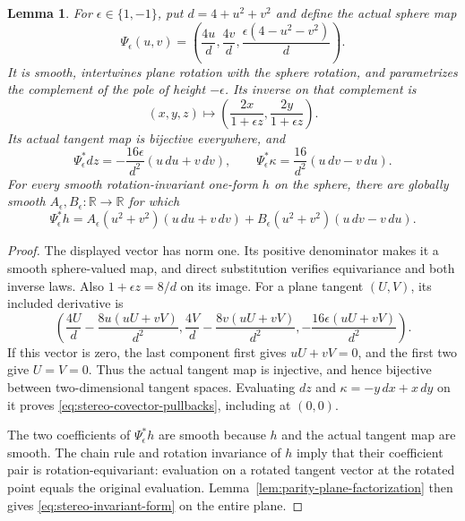 \documentclass[11pt]{article}
\newtheorem{lemma}[theorem]{Lemma}
\newcommand{\R}{\mathbb R}
\begin{document}
\begin{lemma}\label{lem:stereographic-invariant-form}
For $\epsilon\in\{1,-1\}$, put $d=4+u^2+v^2$ and define the actual sphere map
\[
 \Psi_\epsilon(u,v)=
 \left(\frac{4u}{d},\frac{4v}{d},
             \frac{\epsilon(4-u^2-v^2)}{d}\right).
\]
It is smooth, intertwines plane rotation with the sphere rotation, and
parametrizes the complement of the pole of height $-\epsilon$.
Its inverse on that complement is
\[
 (x,y,z)\longmapsto
 \left(\frac{2x}{1+\epsilon z},\frac{2y}{1+\epsilon z}\right).
\]
Its actual tangent map is bijective everywhere, and
\begin{equation}\label{eq:stereo-covector-pullbacks}
 \Psi_\epsilon^*dz=-\frac{16\epsilon}{d^2}(u\,du+v\,dv),\qquad
 \Psi_\epsilon^*\kappa=\frac{16}{d^2}(u\,dv-v\,du).
\end{equation}
For every smooth rotation-invariant one-form $h$ on the sphere, there are
globally smooth $A_\epsilon,B_\epsilon:\R\to\R$ for which
\begin{equation}\label{eq:stereo-invariant-form}
 \Psi_\epsilon^*h=
 A_\epsilon(u^2+v^2)(u\,du+v\,dv)
 +B_\epsilon(u^2+v^2)(u\,dv-v\,du).
\end{equation}
\end{lemma}

\begin{proof}
The displayed vector has norm one. Its positive denominator makes it a
smooth sphere-valued map, and direct substitution verifies equivariance
and both inverse laws. Also $1+\epsilon z=8/d$ on its image.
For a plane tangent $(U,V)$, its included derivative is
\[
 \left(\frac{4U}{d}-\frac{8u(uU+vV)}{d^2},
       \frac{4V}{d}-\frac{8v(uU+vV)}{d^2},
       -\frac{16\epsilon(uU+vV)}{d^2}\right).
\]
If this vector is zero, the last component first gives $uU+vV=0$,
and the first two give $U=V=0$. Thus the actual tangent map is injective,
and hence bijective between two-dimensional tangent spaces.
Evaluating $dz$ and $\kappa=-y\,dx+x\,dy$ on it proves
\eqref{eq:stereo-covector-pullbacks}, including at $(0,0)$.

The two coefficients of $\Psi_\epsilon^*h$ are smooth because $h$ and
the actual tangent map are smooth. The chain rule and rotation
invariance of $h$ imply that their coefficient pair is rotation-equivariant:
evaluation on a rotated tangent vector at the rotated point equals
the original evaluation. Lemma~\ref{lem:parity-plane-factorization}
then gives \eqref{eq:stereo-invariant-form} on the entire plane.
\end{proof}
\end{document}

